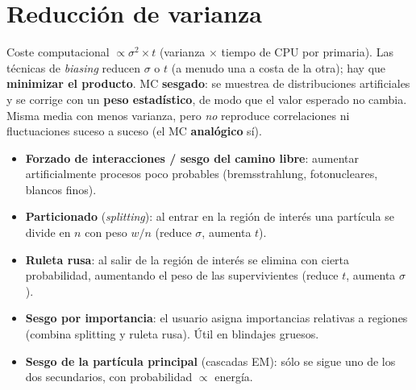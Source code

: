 \section{Reducción de varianza}
\begin{clave}[Idea]
Coste computacional $\propto\sigma^2\times t$ (varianza $\times$ tiempo de CPU por primaria). Las técnicas de \emph{biasing} reducen $\sigma$ o $t$
(a menudo una a costa de la otra); hay que \textbf{minimizar el producto}. MC \textbf{sesgado}: se muestrea de distribuciones artificiales y se
corrige con un \textbf{peso estadístico}, de modo que el valor esperado no cambia. Misma media con menos varianza, pero \emph{no} reproduce
correlaciones ni fluctuaciones suceso a suceso (el MC \textbf{analógico} sí).
\end{clave}
\begin{itemize}
\item \textbf{Forzado de interacciones / sesgo del camino libre}: aumentar artificialmente procesos poco probables (bremsstrahlung, fotonucleares, blancos finos).
\item \textbf{Particionado} (\emph{splitting}): al entrar en la región de interés una partícula se divide en $n$ con peso $w/n$ (reduce $\sigma$, aumenta $t$).
\item \textbf{Ruleta rusa}: al salir de la región de interés se elimina con cierta probabilidad, aumentando el peso de las supervivientes (reduce $t$, aumenta $\sigma$).
\item \textbf{Sesgo por importancia}: el usuario asigna importancias relativas a regiones (combina splitting y ruleta rusa). Útil en blindajes gruesos.
\item \textbf{Sesgo de la partícula principal} (cascadas EM): sólo se sigue uno de los dos secundarios, con probabilidad $\propto$ energía.
\end{itemize}

